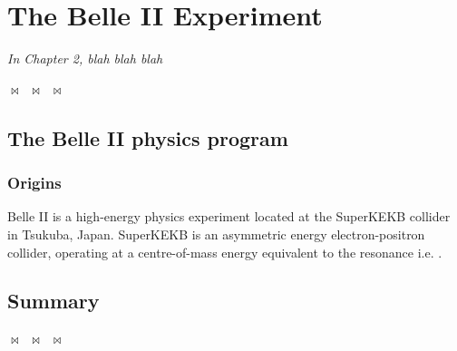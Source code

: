 \chapter{The Belle II Experiment}
\label{chap:ch2}
\textit{In Chapter 2, blah blah blah} 
\begin{center}
  $\bowtie$~$\bowtie$~$\bowtie$
\end{center}
\section{The Belle II physics program}
    \subsection{Origins}
        Belle II is a high-energy physics experiment located at the SuperKEKB collider in Tsukuba, Japan.
        SuperKEKB is an asymmetric energy electron-positron collider, operating at a centre-of-mass energy equivalent to the \FourS resonance i.e. \gev.
\section{Summary}
\begin{center}
  $\bowtie$~$\bowtie$~$\bowtie$
\end{center}
